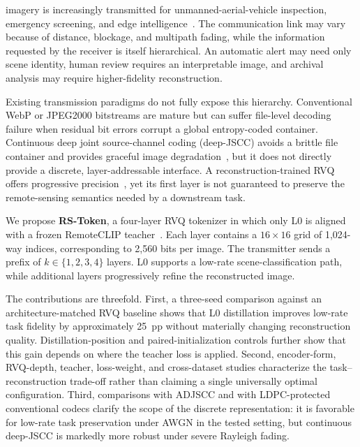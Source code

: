 \documentclass[letterpaper,journal]{IEEEtran}
\newcommand{\pp}{~pp\xspace}
\begin{document}
 imagery is increasingly transmitted for unmanned-aerial-vehicle inspection, emergency screening, and edge intelligence~\cite{gao2022task}. The communication link may vary because of distance, blockage, and multipath fading, while the information requested by the receiver is itself hierarchical. An automatic alert may need only scene identity, human review requires an interpretable image, and archival analysis may require higher-fidelity reconstruction.

Existing transmission paradigms do not fully expose this hierarchy. Conventional WebP or JPEG2000 bitstreams are mature but can suffer file-level decoding failure when residual bit errors corrupt a global entropy-coded container. Continuous deep joint source-channel coding (deep-JSCC) avoids a brittle file container and provides graceful image degradation~\cite{deepjscc,xu2022adjscc,yang2024swinjscc}, but it does not directly provide a discrete, layer-addressable interface. A reconstruction-trained RVQ offers progressive precision~\cite{lee2022residual,moc-rvq}, yet its first layer is not guaranteed to preserve the remote-sensing semantics needed by a downstream task.

We propose \textbf{RS-Token}, a four-layer RVQ tokenizer in which only L0 is aligned with a frozen RemoteCLIP teacher~\cite{liu2024remoteclip}. Each layer contains a $16\times16$ grid of 1,024-way indices, corresponding to 2,560 bits per image. The transmitter sends a prefix of $k\in\{1,2,3,4\}$ layers. L0 supports a low-rate scene-classification path, while additional layers progressively refine the reconstructed image.

The contributions are threefold. First, a three-seed comparison against an architecture-matched RVQ baseline shows that L0 distillation improves low-rate task fidelity by approximately 25\pp without materially changing reconstruction quality. Distillation-position and paired-initialization controls further show that this gain depends on where the teacher loss is applied. Second, encoder-form, RVQ-depth, teacher, loss-weight, and cross-dataset studies characterize the task--reconstruction trade-off rather than claiming a single universally optimal configuration. Third, comparisons with ADJSCC and with LDPC-protected conventional codecs clarify the scope of the discrete representation: it is favorable for low-rate task preservation under AWGN in the tested setting, but continuous deep-JSCC is markedly more robust under severe Rayleigh fading.
\end{document}
